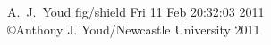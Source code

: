 \documentclass[a4paper,oneside,12pt]{report}
\begin{document}
           {A.~J.~Youd}
           {fig/shield}
           {\small{Fri 11 Feb 20:32:03 2011}\\
            \tiny{\copyright Anthony J. Youd/Newcastle University 2011}}



  \tableofcontents

  \clearpage


  
  
  
  
  

  \appendix

  

  
  
\end{document}
